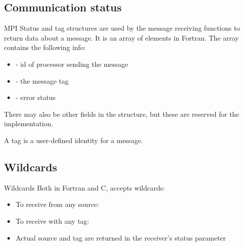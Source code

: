 \documentclass[aspectratio=43]{beamer}
\begin{document}
\subsection{Communication status}
\begin{frame}[fragile]{MPI Status and tag}
\justifying
{} structures are used by the message receiving functions to return data about a message.
It is an  array of  elements in Fortran.
The array contains the following info:
\begin{itemize}
\item {} - id of processor sending the message
\item {} - the message tag
\item {} - error status
\end{itemize}
There may also be other fields in the structure, but these are reserved for the implementation.

A tag is a user-defined identity for a message.

\end{frame}

\subsection{Wildcards}
\begin{frame}[fragile]{Wildcards}
    Both in Fortran and C,   accepts wildcards:
\begin{itemize}
    \item To receive from any source: 
    \item To receive with any tag: 
\item Actual source and tag are returned in the receiver's status parameter
\end{itemize}
\end{frame}
\end{document}
